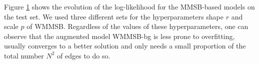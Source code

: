 Figure \ref{fig:conv_entropy} shows the evolution of the log-likelihood for the MMSB-based models on the test set. We used three different sets for the hyperparameters shape $r$ and scale $p$ of WMMSB. Regardless of the values of these hyperparameters, one can observe that the augmented model WMMSB-bg is less prone to overfitting, usually converges to a better solution and only needs a small proportion of the total number $N^2$ of edges to do so.

\begin{figure}[h]
\centering
	
    \label{fig:conv_entropy}
\end{figure}







